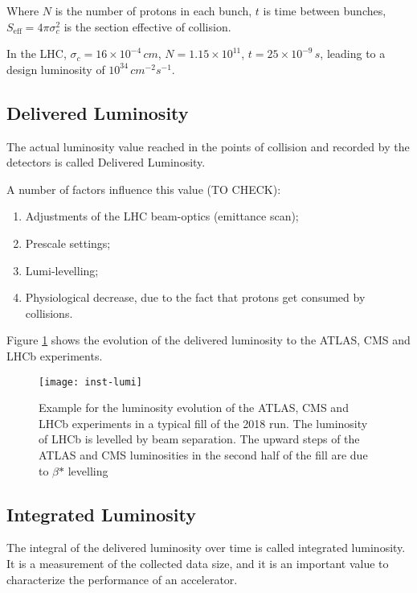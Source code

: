 Where $N$ is the number of protons in each bunch, $t$ is time between bunches, $S_{\text{eff}} = 4 \pi \sigma_c^2$ is the section effective of collision.

In the LHC, $\sigma _c= 16\times 10^{-4}\, cm$, $N = 1.15\times10^{11}$, $t = 25 \times 10^{-9}\, s$, leading to a design luminosity of $10^{34}\, cm^{-2}s^{-1}$.

\subsection{Delivered Luminosity}

The actual luminosity value reached in the points of collision and recorded by the detectors is called Delivered Luminosity.

A number of factors influence this value (TO CHECK):

\begin{enumerate}
	\item Adjustments of the LHC beam-optics (emittance scan);
	\item Prescale settings;
	\item Lumi-levelling;
	\item Physiological decrease, due to the fact that protons get consumed by collisions.
\end{enumerate}

Figure \ref{fig:lum_evolution} shows the evolution of the delivered luminosity to the ATLAS, CMS and LHCb experiments.


\begin{figure}
	\centerline{
		\texttt{[image: inst-lumi]}}
	\caption{Example for the luminosity evolution of the ATLAS, CMS and LHCb experiments in a typical fill of the 2018 run. The luminosity of LHCb is levelled by beam separation. The upward steps of the ATLAS and CMS luminosities in the second half of the fill are due to $\beta\text{*}$ levelling
		\cite{Wenninger:2018cgs}}
	\label{fig:lum_evolution}
\end{figure}


\subsection{Integrated Luminosity}

The integral of the delivered luminosity over time is called integrated luminosity. It is a measurement of the collected data size, and it is an important value to characterize the performance of an accelerator.

